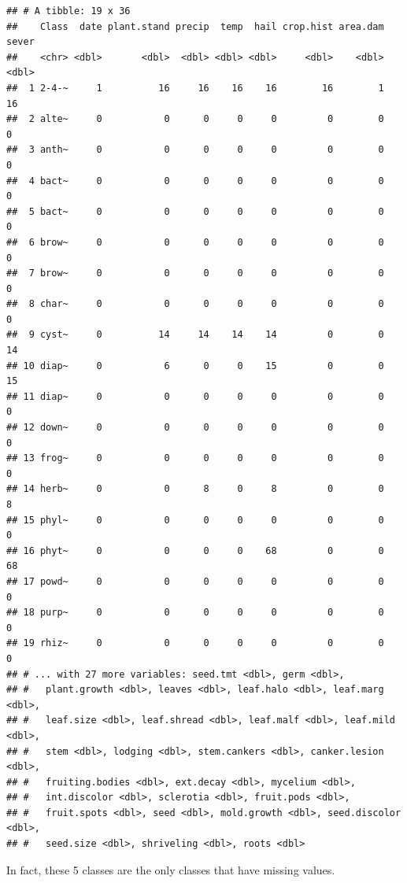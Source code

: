 \documentclass[]{book}
\begin{document}
\begin{verbatim}
## # A tibble: 19 x 36
##    Class  date plant.stand precip  temp  hail crop.hist area.dam sever
##    <chr> <dbl>       <dbl>  <dbl> <dbl> <dbl>     <dbl>    <dbl> <dbl>
##  1 2-4-~     1          16     16    16    16        16        1    16
##  2 alte~     0           0      0     0     0         0        0     0
##  3 anth~     0           0      0     0     0         0        0     0
##  4 bact~     0           0      0     0     0         0        0     0
##  5 bact~     0           0      0     0     0         0        0     0
##  6 brow~     0           0      0     0     0         0        0     0
##  7 brow~     0           0      0     0     0         0        0     0
##  8 char~     0           0      0     0     0         0        0     0
##  9 cyst~     0          14     14    14    14         0        0    14
## 10 diap~     0           6      0     0    15         0        0    15
## 11 diap~     0           0      0     0     0         0        0     0
## 12 down~     0           0      0     0     0         0        0     0
## 13 frog~     0           0      0     0     0         0        0     0
## 14 herb~     0           0      8     0     8         0        0     8
## 15 phyl~     0           0      0     0     0         0        0     0
## 16 phyt~     0           0      0     0    68         0        0    68
## 17 powd~     0           0      0     0     0         0        0     0
## 18 purp~     0           0      0     0     0         0        0     0
## 19 rhiz~     0           0      0     0     0         0        0     0
## # ... with 27 more variables: seed.tmt <dbl>, germ <dbl>,
## #   plant.growth <dbl>, leaves <dbl>, leaf.halo <dbl>, leaf.marg <dbl>,
## #   leaf.size <dbl>, leaf.shread <dbl>, leaf.malf <dbl>, leaf.mild <dbl>,
## #   stem <dbl>, lodging <dbl>, stem.cankers <dbl>, canker.lesion <dbl>,
## #   fruiting.bodies <dbl>, ext.decay <dbl>, mycelium <dbl>,
## #   int.discolor <dbl>, sclerotia <dbl>, fruit.pods <dbl>,
## #   fruit.spots <dbl>, seed <dbl>, mold.growth <dbl>, seed.discolor <dbl>,
## #   seed.size <dbl>, shriveling <dbl>, roots <dbl>
\end{verbatim}

In fact, these 5 classes are the only classes that have missing values.
\end{document}
